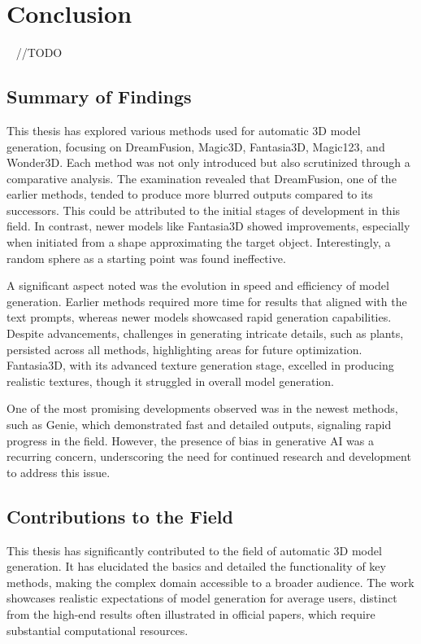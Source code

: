 \chapter{Conclusion}~\label{ch:conclusion}
//TODO

\section{Summary of Findings}

This thesis has explored various methods used for automatic 3D model generation, focusing on DreamFusion, Magic3D, Fantasia3D, Magic123, and Wonder3D. Each method was not only introduced but also scrutinized through a comparative analysis. The examination revealed that DreamFusion, one of the earlier methods, tended to produce more blurred outputs compared to its successors. This could be attributed to the initial stages of development in this field. In contrast, newer models like Fantasia3D showed improvements, especially when initiated from a shape approximating the target object. Interestingly, a random sphere as a starting point was found ineffective.

A significant aspect noted was the evolution in speed and efficiency of model generation. Earlier methods required more time for results that aligned with the text prompts, whereas newer models showcased rapid generation capabilities. Despite advancements, challenges in generating intricate details, such as plants, persisted across all methods, highlighting areas for future optimization. Fantasia3D, with its advanced texture generation stage, excelled in producing realistic textures, though it struggled in overall model generation.

One of the most promising developments observed was in the newest methods, such as Genie, which demonstrated fast and detailed outputs, signaling rapid progress in the field. However, the presence of bias in generative AI was a recurring concern, underscoring the need for continued research and development to address this issue.

\section{Contributions to the Field}

This thesis has significantly contributed to the field of automatic 3D model generation. It has elucidated the basics and detailed the functionality of key methods, making the complex domain accessible to a broader audience. The work showcases realistic expectations of model generation for average users, distinct from the high-end results often illustrated in official papers, which require substantial computational resources.

